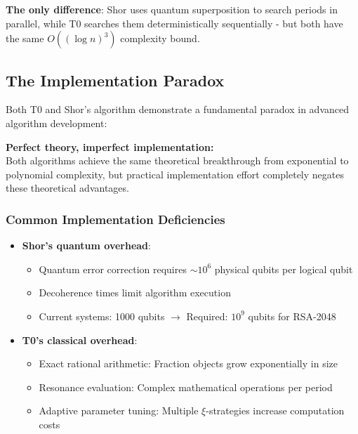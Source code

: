 	\textbf{The only difference}: Shor uses quantum superposition to search periods in parallel, while T0 searches them deterministically sequentially - but both have the same $O((\log n)^3)$ complexity bound.
	
	\subsection{The Implementation Paradox}
	
	Both T0 and Shor's algorithm demonstrate a fundamental paradox in advanced algorithm development:
	
	\begin{tcolorbox}[colback=yellow!10,colframe=orange!50,title=Core Problem]
		\textbf{Perfect theory, imperfect implementation:} \\
		Both algorithms achieve the same theoretical breakthrough from exponential to polynomial complexity, but practical implementation effort completely negates these theoretical advantages.
	\end{tcolorbox}
	
	\subsubsection{Common Implementation Deficiencies}
	\begin{itemize}
		\item \textbf{Shor's quantum overhead}: 
		\begin{itemize}
			\item Quantum error correction requires $\sim 10^6$ physical qubits per logical qubit
			\item Decoherence times limit algorithm execution
			\item Current systems: 1000 qubits $\rightarrow$ Required: $10^9$ qubits for RSA-2048
		\end{itemize}
		
		\item \textbf{T0's classical overhead}:
		\begin{itemize}
			\item Exact rational arithmetic: Fraction objects grow exponentially in size
			\item Resonance evaluation: Complex mathematical operations per period
			\item Adaptive parameter tuning: Multiple $\xi$-strategies increase computation costs
		\end{itemize}
	\end{itemize}
	
